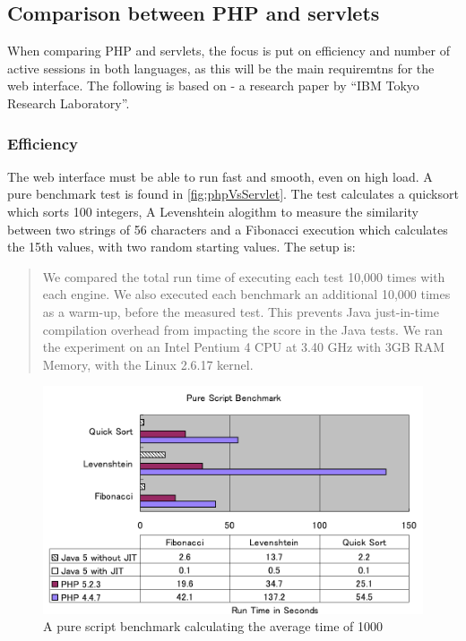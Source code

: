 \subsection*{Comparison between PHP and servlets}
When comparing PHP and servlets, the focus is put on efficiency and number of active sessions in both languages, as this will be the main requiremtns for the web interface. The following is based on \cite{servletVsPHP} - a research paper by ``IBM Tokyo Research Laboratory''.

\subsubsection*{Efficiency}
The web interface must be able to run fast and smooth, even on high load. A pure benchmark test is found in \autoref{fig:phpVsServlet}. The test calculates a quicksort which sorts 100 integers, A Levenshtein alogithm to measure the similarity between two strings of 56
characters and a Fibonacci execution which calculates the 15th values, with two random starting values. The setup is:

\begin{quotation}
We compared the total run time of
executing each test 10,000 times with each engine. We also executed each benchmark
an additional 10,000 times as a warm-up, before the measured test. This prevents
Java just-in-time compilation overhead from impacting the score in the Java tests.
We ran the experiment on an Intel Pentium 4 CPU at 3.40 GHz with 3GB RAM
Memory, with the Linux 2.6.17 kernel. \cite[p. 167]{servletVsPHP}
\end{quotation}

\begin{figure}[htbp]
	\centering
		\includegraphics[width=1.00\textwidth]{images/phpVsServlet.png}
	\caption{A pure script benchmark calculating the average time of 1000 \cite{servletVsPHP}}
	\label{fig:phpVsServlet}
\end{figure}

